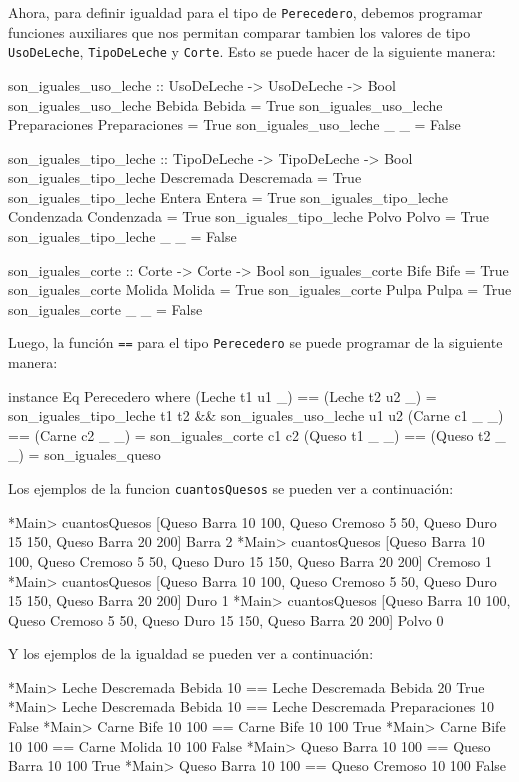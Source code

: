 \documentclass{article}
\begin{document}
\newpage
Ahora, para definir igualdad para el tipo de \texttt{Perecedero}, debemos programar funciones auxiliares que nos permitan comparar tambien los valores de tipo \texttt{UsoDeLeche}, \texttt{TipoDeLeche} y \texttt{Corte}. Esto se puede hacer de la siguiente manera:
\begin{haskell}
son_iguales_uso_leche :: UsoDeLeche -> UsoDeLeche -> Bool
son_iguales_uso_leche Bebida Bebida = True
son_iguales_uso_leche Preparaciones Preparaciones = True
son_iguales_uso_leche _ _ = False

son_iguales_tipo_leche :: TipoDeLeche -> TipoDeLeche -> Bool
son_iguales_tipo_leche Descremada Descremada = True
son_iguales_tipo_leche Entera Entera = True
son_iguales_tipo_leche Condenzada Condenzada = True
son_iguales_tipo_leche Polvo Polvo = True
son_iguales_tipo_leche _ _ = False

son_iguales_corte :: Corte -> Corte -> Bool
son_iguales_corte Bife Bife = True
son_iguales_corte Molida Molida = True
son_iguales_corte Pulpa Pulpa = True
son_iguales_corte _ _ = False
\end{haskell}
Luego, la función \texttt{==} para el tipo \texttt{Perecedero} se puede programar de la siguiente manera:
\begin{haskell}
instance Eq Perecedero where
    (Leche t1 u1 _) == (Leche t2 u2 _) = son_iguales_tipo_leche t1 t2 && son_iguales_uso_leche u1 u2
    (Carne c1 _ _) == (Carne c2 _ _) = son_iguales_corte c1 c2
    (Queso t1 _ _) == (Queso t2 _ _) = son_iguales_queso    
\end{haskell}
Los ejemplos de la funcion \texttt{cuantosQuesos} se pueden ver a continuación:
\begin{haskell}
*Main> cuantosQuesos [Queso Barra 10 100, Queso Cremoso 5 50, Queso Duro 15 150, Queso Barra 20 200] Barra
2
*Main> cuantosQuesos [Queso Barra 10 100, Queso Cremoso 5 50, Queso Duro 15 150, Queso Barra 20 200] Cremoso
1
*Main> cuantosQuesos [Queso Barra 10 100, Queso Cremoso 5 50, Queso Duro 15 150, Queso Barra 20 200] Duro
1
*Main> cuantosQuesos [Queso Barra 10 100, Queso Cremoso 5 50, Queso Duro 15 150, Queso Barra 20 200] Polvo
0
\end{haskell}
Y los ejemplos de la igualdad se pueden ver a continuación:
\begin{haskell}
*Main> Leche Descremada Bebida 10 == Leche Descremada Bebida 20
True
*Main> Leche Descremada Bebida 10 == Leche Descremada Preparaciones 10
False
*Main> Carne Bife 10 100 == Carne Bife 10 100
True
*Main> Carne Bife 10 100 == Carne Molida 10 100
False
*Main> Queso Barra 10 100 == Queso Barra 10 100
True
*Main> Queso Barra 10 100 == Queso Cremoso 10 100
False
\end{haskell}
\end{document}

